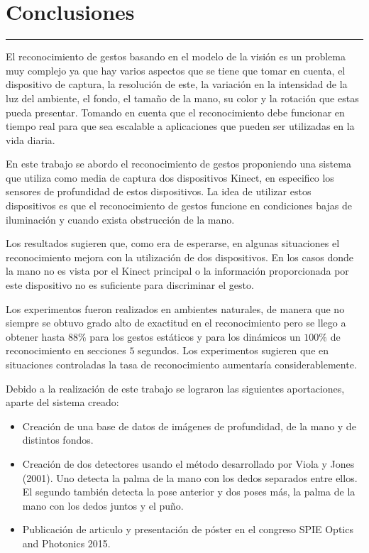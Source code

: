\chapter{Conclusiones}\label{capit:cap6}
\vspace{-2.0325ex}%
\noindent
\rule{\textwidth}{0.5pt}
\vspace{-5.5ex}%
\newcommand{\pushline}{\Indp}%

El reconocimiento de gestos basando en el modelo de la visión es un problema muy complejo ya que hay varios aspectos que se tiene que tomar en cuenta, el dispositivo de captura, la resolución de este, la variación en la intensidad de la luz del ambiente, el fondo, el tamaño de la mano, su color y la rotación que estas pueda presentar. Tomando en cuenta que el reconocimiento debe funcionar en tiempo real para que sea escalable a aplicaciones que pueden ser utilizadas en la vida diaria. 

En este trabajo se abordo el reconocimiento de gestos proponiendo una sistema que utiliza como media de captura dos dispositivos Kinect, en especifico los sensores de profundidad de estos dispositivos. La idea de utilizar estos dispositivos es que el reconocimiento de gestos funcione en condiciones bajas de iluminación y cuando exista obstrucción de la mano.  

Los resultados sugieren que, como era de esperarse, en algunas situaciones el reconocimiento mejora con la utilización de dos dispositivos. En los casos donde la mano no es vista por el Kinect principal o la información proporcionada por este dispositivo no es suficiente para discriminar el gesto.
   
Los experimentos fueron realizados en ambientes naturales, de manera que no siempre se obtuvo grado alto de exactitud en el reconocimiento pero se llego a obtener hasta $88 \%$ para los gestos estáticos y para los dinámicos un $100 \%$ de reconocimiento en secciones $5$ segundos. Los experimentos sugieren que en situaciones controladas la tasa de reconocimiento aumentaría considerablemente. 

Debido a la realización de este trabajo se lograron las siguientes aportaciones, aparte del sistema creado: 
 
\begin{itemize}
\item Creación de una base de datos de imágenes de profundidad, de la mano y de distintos fondos.   

\item Creación de dos detectores usando el método desarrollado por Viola y Jones (2001). Uno detecta la palma de la mano con los dedos separados entre ellos. El segundo también detecta la pose anterior y dos poses más, la palma de la mano con los dedos juntos y el puño. 

\item Publicación de articulo y presentación de póster en el congreso SPIE Optics and Photonics 2015.     

\end{itemize}


